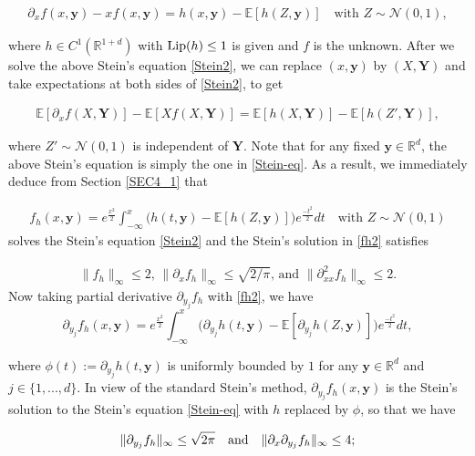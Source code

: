 \documentclass[letterpaper, 11pt,  reqno]{amsart}
\newcommand{\noi}{\noindent}
\newcommand{\R}{\mathbb{R}}
\newcommand{\bE}{\mathbb{E}}
\newcommand{\E}{\mathbb{E}}
\newcommand{\cN}{\mathcal{N}}
\newcommand{\Lip}{\textup{Lip}}
\numberwithin{equation}{section}
\numberwithin{theorem}{section}
\begin{document}
 
\noi
\begin{align}
\label{Stein2}
  \partial_x f(x,\pmb{y})-x f (x,\pmb{y})=h(x,\pmb{y})-\bE[h(Z,\pmb{y})]
  \quad\text{with  $Z \sim \cN(0,1)$},
\end{align}

\noi
where $h\in C^1(\R^{1+d})$ with $\Lip(h)\leq 1$ is given
and $f$ is the unknown. After we solve the above Stein's equation \eqref{Stein2},
we can replace $(x,\pmb{y})$ by $(X,  \mathbf{Y})$ and take expectations at both sides
 of \eqref{Stein2}, to get
 
 \noi
\begin{align}
\label{Stein3}
  \bE[ \partial_x f (X,\mathbf{Y})]-\bE[X f(X,\mathbf{Y})]
=\bE[h(X,\mathbf{Y})]-\bE[h(Z',\mathbf{Y})],
\end{align}


\noi
where $Z' \sim \cN(0,1)$ is independent of $\mathbf{Y}$.
Note that for any fixed $\pmb{y}\in\R^d$,
the above Stein's equation is simply the one in \eqref{Stein-eq}.
As a result, we immediately deduce from 
Section \ref{SEC4_1} that 

\noi 
\begin{align}\label{fh2}
f_h(x, \pmb{y}) 
= e^{\frac{x^2}{2}}\int_{-\infty}^x \big( h(t, \pmb{y}) - \E[ h(Z, \pmb{y})] \big) e^{\frac{-t^2}{2}}dt
\quad\text{with  $Z \sim \cN(0,1)$}
\end{align}
solves the Stein's equation \eqref{Stein2} and the Stein's solution in \eqref{fh2} satisfies 
 
 \noi
 \begin{align}\label{Stein_sol2}
\text{$\| f_h \|_\infty \leq 2$,   $\| \partial_x f_h \|_\infty \leq \sqrt{2/\pi}$,  
and $\|\partial^2_{xx}f_h \|_\infty \leq 2$}.
 \end{align}
Now taking partial derivative $\partial_{y_j} f_h$ with \eqref{fh2},
we have 
\[
\partial_{y_j} f_h(x, \pmb{y}) 
= e^{\frac{x^2}{2}}\int_{-\infty}^x \big(  \partial_{y_j} h(t, \pmb{y}) - \E[  \partial_{y_j} h(Z, \pmb{y})] \big) e^{\frac{-t^2}{2}}dt,
\]

\noi
where $\phi(t) := \partial_{y_j} h(t, \pmb{y})$ is uniformly bounded by $1$
for any $\pmb{y}\in\R^d$ and $j\in\{1,..., d\}$.
In view of the standard Stein's method,
$\partial_{y_j} f_h(x, \pmb{y})$ is the Stein's solution to 
the Stein's equation \eqref{Stein-eq} with $h$ replaced by $\phi$,
so that we have

\noi
\begin{align} \label{2ndbdd}
\| \partial_{y_j} f_h \|_\infty \leq  \sqrt{2\pi}
\quad
{\rm and}\quad
\| \partial_x \partial_{y_j} f_h  \|_\infty \leq  4;
\end{align}
\end{document}
